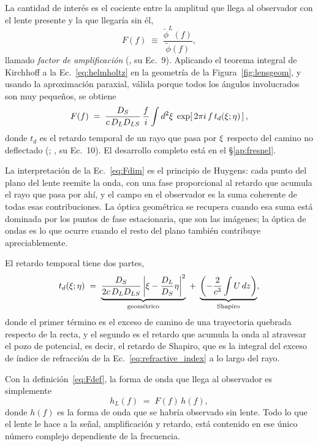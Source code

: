 \documentclass[11pt,a4paper,openany]{book}
\begin{document}
La cantidad de inter\'es es el cociente entre la amplitud que llega al
observador con el lente presente y la que llegar\'ia sin \'el,
\begin{equation}
  F(f)\;\equiv\;\frac{\tilde\phi^{L}(f)}{\tilde\phi(f)} ,
  \label{eq:Fdef}
\end{equation}
llamado \emph{factor de amplificaci\'on} (\citealp{Takahashi2003}, su Ec.~9).
Aplicando el teorema integral de Kirchhoff a la Ec.~\eqref{eq:helmholtz} en la
geometr\'ia de la Figura~\ref{fig:lensgeom}, y usando la aproximaci\'on
paraxial, v\'alida porque todos los \'angulos involucrados son muy peque\~nos,
se obtiene
\begin{equation}
  F(f)\;=\;\frac{D_S}{c\,D_LD_{LS}}\,\frac{f}{i}
  \int d^{2}\vb\xi\;
  \exp\!\left[\,2\pi i\,f\,t_d(\vb\xi;\vb\eta)\,\right] ,
  \label{eq:Fdim}
\end{equation}
donde $t_d$ es el retardo temporal de un rayo que pasa por $\vb\xi$ respecto
del camino no deflectado (\citealp{SchneiderEhlersFalco1992};
\citealp{Takahashi2003}, su Ec.~10). El desarrollo completo est\'a en el
\S\ref{ap:fresnel}.

La interpretaci\'on de la Ec.~\eqref{eq:Fdim} es el principio de Huygens:
cada punto del plano del lente reemite la onda, con una fase proporcional al
retardo que acumula el rayo que pasa por ah\'i, y el campo en el observador es
la suma coherente de todas esas contribuciones. La \'optica geom\'etrica se
recupera cuando esa suma est\'a dominada por los puntos de fase estacionaria,
que son las im\'agenes; la \'optica de ondas es lo que ocurre cuando el resto
del plano tambi\'en contribuye apreciablemente.

El retardo temporal tiene dos partes,
\begin{equation}
  t_d(\vb\xi;\vb\eta)\;=\;
  \underbrace{\frac{D_S}{2c\,D_LD_{LS}}
  \left|\vb\xi-\frac{D_L}{D_S}\vb\eta\right|^{2}}_{\text{geom\'etrico}}
  \;+\;
  \underbrace{\left(-\frac{2}{c^{3}}\int U\,dz\right)}_{\text{Shapiro}} ,
  \label{eq:td_split}
\end{equation}
donde el primer t\'ermino es el exceso de camino de una trayectoria quebrada
respecto de la recta, y el segundo es el retardo que acumula la onda al
atravesar el pozo de potencial, es decir, el retardo de Shapiro, que es la
integral del exceso de \'indice de refracci\'on de la
Ec.~\eqref{eq:refractive_index} a lo largo del rayo.

Con la definici\'on~\eqref{eq:Fdef}, la forma de onda que llega al observador
es simplemente
\begin{equation}
  h_L(f)\;=\;F(f)\,h(f) ,
  \label{eq:hlensed}
\end{equation}
donde $h(f)$ es la forma de onda que se habr\'ia observado sin lente. Todo lo
que el lente le hace a la se\~nal, amplificaci\'on y retardo, est\'a contenido
en ese \'unico n\'umero complejo dependiente de la frecuencia.
\end{document}
